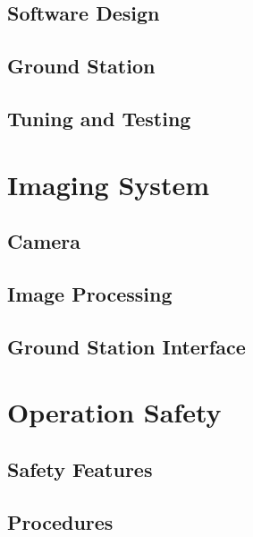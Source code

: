 \documentclass[12pt]{report}
\begin{document}
\subsection{Software Design}

\subsection{Ground Station}

\subsection{Tuning and Testing}

\section{Imaging System}

\subsection{Camera}

\subsection{Image Processing}

\subsection{Ground Station Interface}

\section{Operation Safety}

\subsection{Safety Features}

\subsection{Procedures}
\end{document}
